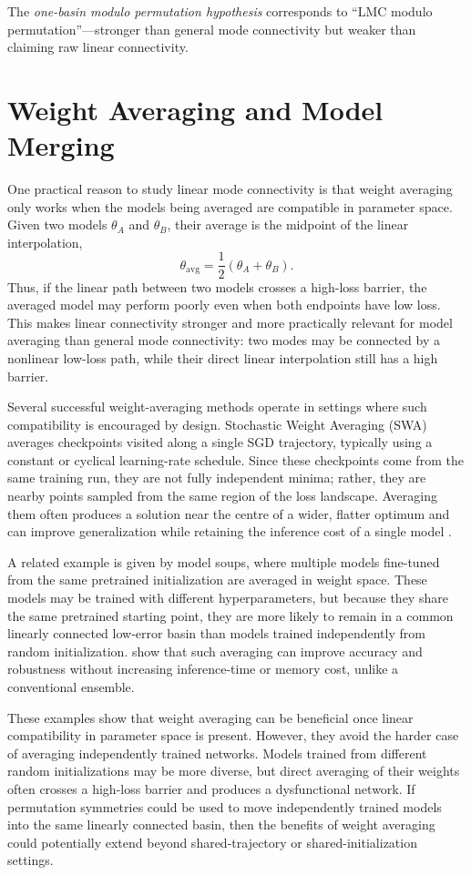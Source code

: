 \documentclass[11pt,a4paper]{report}
\begin{document}
The \textit{one-basin modulo permutation hypothesis} corresponds to ``LMC modulo permutation''---stronger than general mode connectivity but weaker than claiming raw linear connectivity.

\section{Weight Averaging and Model Merging}
\label{sec:weight_averaging}
One practical reason to study linear mode connectivity is that weight averaging 
only works when the models being averaged are compatible in parameter space. Given 
two models $\theta_A$ and $\theta_B$, their average is the midpoint of the linear 
interpolation,
\[
\theta_{\mathrm{avg}} = \frac{1}{2}(\theta_A + \theta_B).
\]
Thus, if the linear path between two models crosses a high-loss barrier, the 
averaged model may perform poorly even when both endpoints have low loss. This 
makes linear connectivity stronger and more practically relevant for model 
averaging than general mode connectivity: two modes may be connected by a nonlinear 
low-loss path, while their direct linear interpolation still has a high barrier.

Several successful weight-averaging methods operate in settings where such 
compatibility is encouraged by design. Stochastic Weight Averaging (SWA) averages 
checkpoints visited along a single SGD trajectory, typically using a constant or 
cyclical learning-rate schedule. Since these checkpoints come from the same 
training run, they are not fully independent minima; rather, they are nearby 
points sampled from the same region of the loss landscape. Averaging them often 
produces a solution near the centre of a wider, flatter optimum and can improve 
generalization while retaining the inference cost of a single model 
\citet{izmailov2018averaging}.

A related example is given by model soups, where multiple models fine-tuned from 
the same pretrained initialization are averaged in weight space. These models may 
be trained with different hyperparameters, but because they share the same 
pretrained starting point, they are more likely to remain in a common linearly 
connected low-error basin than models trained independently from random 
initialization. \citet{wortsman2022model} show that such averaging can improve 
accuracy and robustness without increasing inference-time or memory cost, unlike a 
conventional ensemble.

These examples show that weight averaging can be beneficial once linear 
compatibility in parameter space is present. However, they avoid the harder case 
of averaging independently trained networks. Models trained from different random 
initializations may be more diverse, but direct averaging of their weights often 
crosses a high-loss barrier and produces a dysfunctional network. If permutation 
symmetries could be used to move independently trained models into the same 
linearly connected basin, then the benefits of weight averaging could potentially 
extend beyond shared-trajectory or shared-initialization settings.
\end{document}
